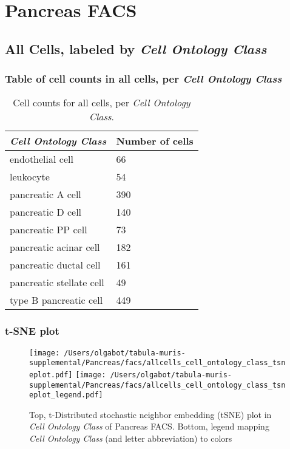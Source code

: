 \clearpage
\section{Pancreas FACS}

\subsection{All Cells, labeled by \emph{Cell Ontology Class}}
\subsubsection{Table of cell counts in all cells, per \emph{Cell Ontology Class}}\begin{table}[h]
\centering
\label{my-label}
\begin{tabular}{@{}ll@{}}
\toprule

\emph{Cell Ontology Class}& Number of cells \\ \midrule
endothelial cell & 66 \\

leukocyte & 54 \\

pancreatic A cell & 390 \\

pancreatic D cell & 140 \\

pancreatic PP cell & 73 \\

pancreatic acinar cell & 182 \\

pancreatic ductal cell & 161 \\

pancreatic stellate cell & 49 \\

type B pancreatic cell & 449 \\
\bottomrule
\end{tabular}
\caption{Cell counts for all cells, per \emph{Cell Ontology Class}.}
\end{table}

\clearpage
\subsubsection{t-SNE plot}
\begin{figure}[h]
\centering
\texttt{[image: /Users/olgabot/tabula-muris-supplemental/Pancreas/facs/allcells\_cell\_ontology\_class\_tsneplot.pdf]}
\texttt{[image: /Users/olgabot/tabula-muris-supplemental/Pancreas/facs/allcells\_cell\_ontology\_class\_tsneplot\_legend.pdf]}
\caption{Top, t-Distributed stochastic neighbor embedding (tSNE) plot  in \emph{Cell Ontology Class} of Pancreas FACS. Bottom, legend mapping \emph{Cell Ontology Class} (and letter abbreviation) to colors}
\end{figure}


